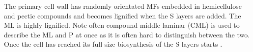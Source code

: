 The primary cell wall has randomly orientated MFs embedded
in hemicellulose and pectic compounds and becomes lignified when the S layers are added.
The ML is highly lignified. Note often compound middle laminar (CML) is used to describe
the ML and P at once as it is often hard to distinguish between the two. Once the cell has reached its
full size biosynthesis of the S layers starts \citep{fromm2013cellular}.